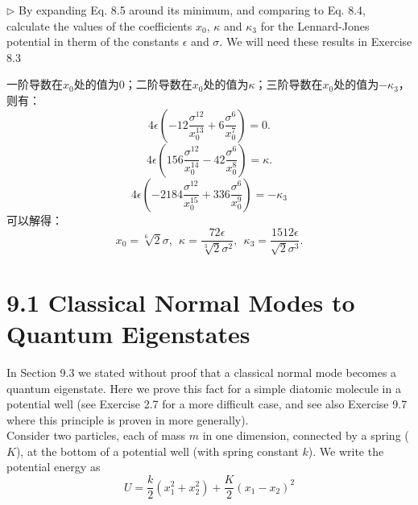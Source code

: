 \documentclass[reqno,a4paper,12pt]{amsart}
\begin{document}
$\triangleright$ By expanding Eq. 8.5 around its minimum, and comparing to Eq. 8.4, calculate the values of the coefficients $x_0$, $\kappa$ and $\kappa_3$ for the Lennard-Jones potential in therm of the constants $\epsilon$ and $\sigma$. We will need these results in Exercise 8.3
\begin{tcolorbox}[breakable, colback = black!5!white, colframe = black]
一阶导数在$x_0$处的值为0；二阶导数在$x_0$处的值为$\kappa$；三阶导数在$x_0$处的值为$-\kappa_3$，则有：
\[
	4\epsilon\left( -12\frac{\sigma^{12}}{x_0^{13}} + 6\frac{\sigma^6}{x_0^7} \right) = 0.
\]
\[
	4\epsilon\left( 156\frac{\sigma^{12}}{x_0^{14}} - 42\frac{\sigma^6}{x_0^8} \right) = \kappa.
\]
\[
	4\epsilon\left( -2184\frac{\sigma^{12}}{x_0^{15}} + 336\frac{\sigma^6}{x_0^9} \right) = -\kappa_3
\]
可以解得：
\[
	x_0 = \sqrt[6]{2}\sigma, ~~ \kappa = \frac{72\epsilon}{\sqrt[3]{2}\sigma^2}, ~~ \kappa_3 = \frac{1512\epsilon}{\sqrt{2}\sigma^3}.
\]
\end{tcolorbox}


\section{\textbf{9.1 Classical Normal Modes to Quantum Eigenstates}}
In Section 9.3 we stated without proof that a classical normal mode becomes a quantum eigenstate. Here we prove this fact for a simple diatomic molecule in a potential well (see Exercise 2.7 for a more difficult case, and see also Exercise 9.7 where this principle is proven in more generally). \\
Consider two particles, each of mass $m$ in one dimension, connected by a spring ($K$), at the bottom of a potential well (with spring constant $k$). We write the potential energy as 
\[
	U = \frac{k}{2}(x_1^2+x_2^2) + \frac{K}{2}(x_1-x_2)^2
\]
\end{document}
